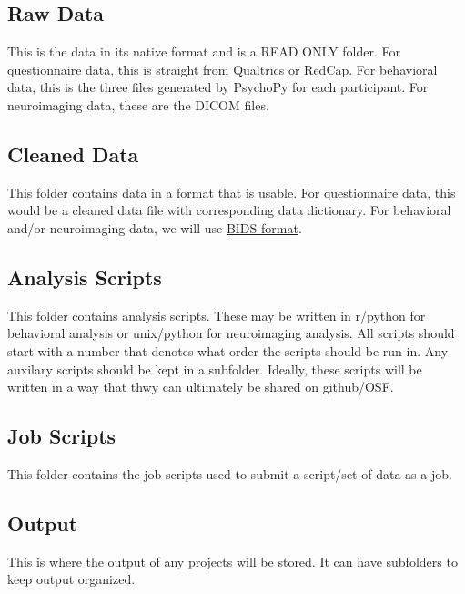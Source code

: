 \documentclass[]{book}
\begin{document}
\hypertarget{raw-data}{%
\subsection{Raw Data}\label{raw-data}}

This is the data in its native format and is a READ ONLY folder. For questionnaire data, this is straight from Qualtrics or RedCap. For behavioral data, this is the three files generated by PsychoPy for each participant. For neuroimaging data, these are the DICOM files.

\hypertarget{cleaned-data}{%
\subsection{Cleaned Data}\label{cleaned-data}}

This folder contains data in a format that is usable. For questionnaire data, this would be a cleaned data file with corresponding data dictionary. For behavioral and/or neuroimaging data, we will use \href{https://bids.neuroimaging.io/}{BIDS format}.

\hypertarget{analysis-scripts}{%
\subsection{Analysis Scripts}\label{analysis-scripts}}

This folder contains analysis scripts. These may be written in r/python for behavioral analysis or unix/python for neuroimaging analysis. All scripts should start with a number that denotes what order the scripts should be run in. Any auxilary scripts should be kept in a subfolder. Ideally, these scripts will be written in a way that thwy can ultimately be shared on github/OSF.

\hypertarget{job-scripts}{%
\subsection{Job Scripts}\label{job-scripts}}

This folder contains the job scripts used to submit a script/set of data as a job.

\hypertarget{output}{%
\subsection{Output}\label{output}}

This is where the output of any projects will be stored. It can have subfolders to keep output organized.
\end{document}
